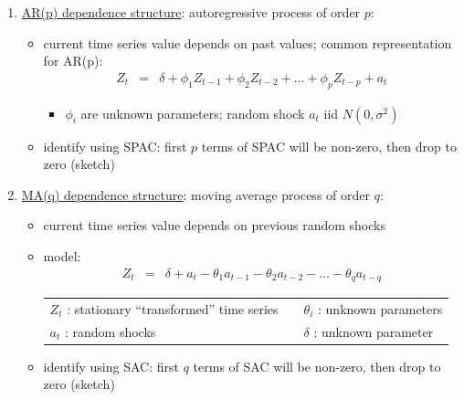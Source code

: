 \documentclass[12pt]{../notes}
\begin{document}
\begin{enumerate}[leftmargin=*]
\begin{itemize}
\begin{enumerate}
\item \underline{AR(p) dependence structure}: autoregressive process of order $p$:
\begin{itemize}
\item current time series value depends on past values; common representation for AR(p):
\begin{eqnarray}
Z_t & = & \delta + \phi_1 Z_{t-1} + \phi_2 Z_{t-2} + \ldots + \phi_p Z_{t-p} + a_t \nonumber
\end{eqnarray}
    \begin{itemize}
      \item $\phi_i$ are unknown parameters; random shock $a_t$ iid $N(0,\sigma^2)$
    \end{itemize}
\item identify using SPAC:
  first $p$ terms of SPAC will be non-zero, then drop to zero (sketch)\\ \vspace{3em}
\end{itemize}


\item \underline{MA(q) dependence structure}: moving average process of order $q$:
 \begin{itemize}
    \item current time series value depends on previous random shocks
    \item model:\\ \vspace{-2em}
\begin{eqnarray}
  Z_t & = & \delta + a_t - \theta_1 a_{t-1} - \theta_2 a_{t-2} - \ldots - \theta_q a_{t-q} \nonumber
\end{eqnarray}
\begin{tabular}{l l l}
   $Z_t$ : stationary ``transformed'' time series  & &  $\theta_i$ : unknown parameters\\
   $a_t$ : random shocks  & & $\delta$ : unknown parameter
\end{tabular}

  \vspace{1em}

   \item identify using SAC:
  first $q$ terms of SAC will be non-zero, then drop to zero (sketch)\\ \vspace{4em}
\end{itemize}

\end{enumerate}


\end{itemize}
\end{enumerate}
\end{document}
